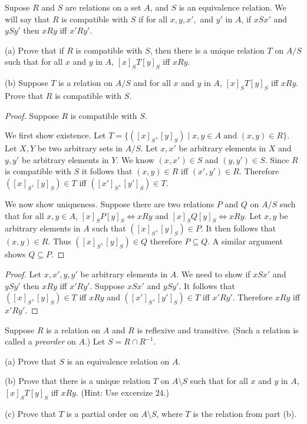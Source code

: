 \begin{tcolorbox}[title=Problem 24, breakable]
    Supose $R$ and $S$ are relations on a set $A$, and $S$
    is an equivalence relation.
    We will say that $R$ is compatible with $S$ if for all $x, y, x',$ and 
    $y'$ in $A$, if $xSx'$ and $ySy'$ then $xRy$ iff $x'Ry'$.

    (a) Prove that if $R$ is compatible with $S$,
        then there is a unique relation $T$ on $A / S$
        such that for all $x$ and $y$ in $A$, $[x]_S T[y]_S$ iff $xRy$.

    (b) Suppose $T$ is a relation on $A / S$ and for all $x$
        and $y$ in $A$, $[x]_S T [y]_S$ iff $xRy$.
        Prove that $R$ is compatible with $S$.
\end{tcolorbox}

\begin{proof}
    Suppose $R$ is compatible with $S$.

    We first show existence.
    Let $T = \{([x]_S, [y]_S) \mid x, y \in A \text{ and } (x, y) \in R\}$.
    Let $X, Y$ be two arbitrary sets in $A / S$.
    Let $x, x'$ be arbitrary elements in $X$
        and $y, y'$ be arbitrary elements in $Y$.
    We know $(x, x') \in S$ and $(y, y') \in S$.
    Since $R$ is compatible with $S$ it follows that 
        $(x, y) \in R$ iff $(x', y') \in R$.
    Therefore $([x]_S, [y]_S) \in T$ iff $([x']_S, [y']_S) \in T$.

    We now show uniqueness.
    Suppose there are two relations $P$ and $Q$ on $A / S$
    such that for all $x, y \in A$,
    $[x]_S P [y]_S \iff xRy$ and $[x]_S Q [y]_S \iff xRy$.
    Let $x, y$ be arbitrary elements in $A$
        such that $([x]_S, [y]_S) \in P$.
    It then follows that $(x, y) \in R$.
    Thus $([x]_S, [y]_S) \in Q$ therefore $P \subseteq Q$. 
    A similar argument shows $Q \subseteq P$.
\end{proof}

\begin{proof}
    Let $x, x', y, y'$ be arbitrary elements in $A$.
    We need to show if $xSx'$ and $ySy'$ then $xRy$ iff $x'Ry'$.
    Suppose $xSx'$ and $ySy'$.
    It follows that $([x]_S, [y]_S) \in T$ iff $xRy$
        and $([x']_S, [y']_S) \in T$ iff $x'Ry'$.
    Therefore $xRy$ iff $x'Ry'$.
\end{proof}

\newpage
\begin{tcolorbox}[title=Problem 25, breakable]
    Suppose $R$ is a relation on $A$ and $R$ is reflexive and transitive.
    (Such a relation is called a \emph{preorder} on $A$.) Let $S = R \cap R^{-1}$.

    (a) Prove that $S$ is an equivalence relation on $A$.

    (b) Prove that there is a unique relation $T$ on $A \setminus S$ such that 
        for all $x$ and $y$ in $A$, $[x]_S T[y]_S$ iff $xRy$. (Hint: Use excersize $24$.)

    (c) Prove that $T$ is a partial order on $A \setminus S$, where $T$ is the relation 
        from part (b).
\end{tcolorbox}


